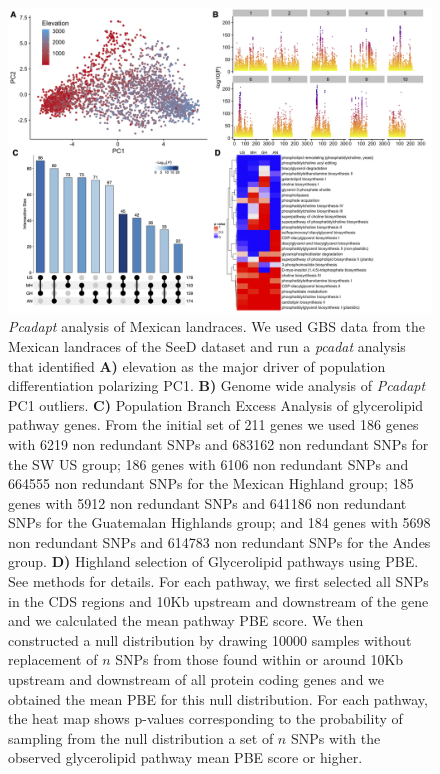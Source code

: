 \documentclass[9pt,twocolumn,twoside,lineno]{BioRxiv}
\begin{document}
\begin{figure}[t]
\begin{center}
\includegraphics[width=0.9\paperwidth]{Sup_Figures/Sup_Fig_1.png}
\caption{\textit{Pcadapt} analysis of Mexican landraces. We used GBS data from the Mexican landraces of the SeeD dataset \cite{Romero_Navarro2017-cn} and run a \textit{pcadat} analysis \cite{Luu2017-ws} that identified \textbf{A)} elevation as the major driver of population differentiation polarizing PC1.  
\textbf{B)} Genome wide analysis of \textit{Pcadapt} PC1 outliers. 
\textbf{C)} Population Branch Excess Analysis of glycerolipid pathway genes.
From the initial set of 211 genes we used 186 genes with 6219 non redundant SNPs and 683162 non redundant SNPs for the SW US group; 186 genes with 6106 non redundant SNPs and 664555 non redundant SNPs for the Mexican Highland group; 185 genes with 5912 non redundant SNPs and 641186 non redundant SNPs for the Guatemalan Highlands group; and 184 genes with 5698 non redundant SNPs and 614783 non redundant SNPs for the Andes group.
\textbf{D)} Highland selection of Glycerolipid pathways using PBE. See methods for details.
For each pathway, we first selected all SNPs in the CDS regions and 10Kb upstream and downstream of the gene and we calculated the mean pathway PBE score. 
We then constructed a null distribution by drawing 10000 samples without replacement of $n$ SNPs from those found within or around 10Kb upstream and downstream of all protein coding genes and we obtained the mean PBE for this null distribution. 
For each pathway, the heat map shows p-values corresponding to the probability of sampling from the null distribution a set of $n$ SNPs with the observed glycerolipid pathway mean PBE score or higher. 
}
\label{SupFig1}
\end{center}
\end{figure} 
\end{document}
